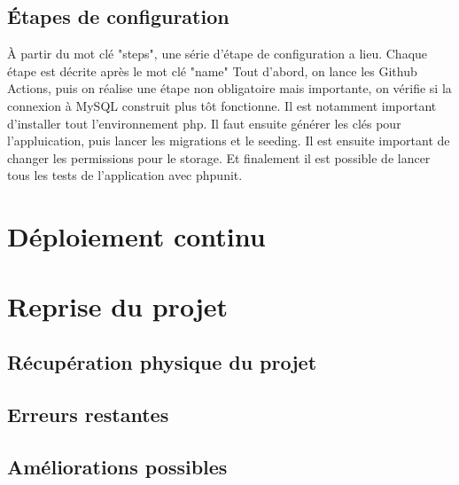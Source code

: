 \documentclass[
    iai, %
    il, %
]{heig-tb}
\begin{document}
\section{Étapes de configuration}

À partir du mot clé "steps", une série d'étape de configuration a lieu.\newline
Chaque étape est décrite après le mot clé "name"\newline
Tout d'abord, on lance les Github Actions, puis on réalise une étape non obligatoire mais
importante, on vérifie si la connexion à MySQL construit plus tôt fonctionne.\newline
Il est notamment important d'installer tout l'environnement php.\newline
Il faut ensuite générer les clés pour l'appluication, puis lancer les migrations et le
seeding.\newline
Il est ensuite important de changer les permissions pour le storage. Et finalement il est possible
de lancer tous les tests de l'application avec phpunit.

\chapter{Déploiement continu}

\chapter{Reprise du projet}

\section{Récupération physique du projet}

\section{Erreurs restantes}

\section{Améliorations possibles}

\end{document}
